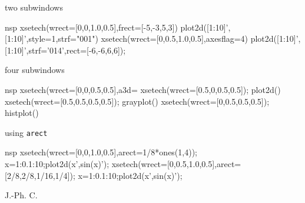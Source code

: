 \begin{examples}

\noindent two subwindows 

\begin{mintednsp}{nsp}
  xsetech(wrect=[0,0,1.0,0.5],frect=[-5,-3,5,3])
  plot2d([1:10]',[1:10]',style=1,strf="001")
  xsetech(wrect=[0,0.5,1.0,0.5],axesflag=4)
  plot2d([1:10]',[1:10]',strf='014',rect=[-6,-6,6,6]);
\end{mintednsp}

\noindent four subwindows

\begin{mintednsp}{nsp}
  xsetech(wrect=[0,0,0.5,0.5],a3d=%
  xsetech(wrect=[0.5,0,0.5,0.5]); plot2d()
  xsetech(wrect=[0.5,0.5,0.5,0.5]); grayplot()
  xsetech(wrect=[0,0.5,0.5,0.5]); histplot()
\end{mintednsp}

\noindent using \verb!arect!

\begin{mintednsp}{nsp}
  xsetech(wrect=[0,0,1.0,0.5],arect=1/8*ones(1,4));
  x=1:0.1:10;plot2d(x',sin(x)');
  xsetech(wrect=[0,0.5,1.0,0.5],arect=[2/8,2/8,1/16,1/4]);
  x=1:0.1:10;plot2d(x',sin(x)');
\end{mintednsp}
\end{examples}
\begin{manseealso}
      
\end{manseealso}

\begin{authors}
  J.-Ph. C.  
\end{authors}

